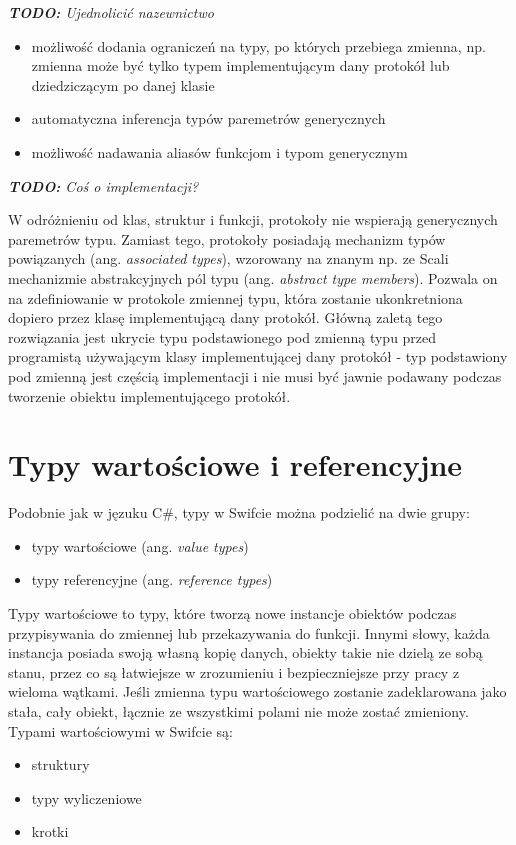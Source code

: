 \documentclass[mgr, shortabstract]{iithesis}
\newcommand{\todo}[1]{
  \textit{\textbf{TODO: }#1}
}
\newcommand{\ang}[1]{ang. \textit{#1}}
\begin{document}
\todo{Ujednolicić nazewnictwo}
\begin{itemize}
  \item możliwość dodania ograniczeń na typy, po których przebiega zmienna, np. zmienna może być tylko typem implementującym dany protokół lub dziedziczącym po danej klasie
  \item automatyczna inferencja typów paremetrów generycznych
  \item możliwość nadawania aliasów funkcjom i typom generycznym
\end{itemize}
\todo{Coś o implementacji?}

W odróżnieniu od klas, struktur i funkcji, protokoły nie wspierają generycznych paremetrów typu. Zamiast tego, protokoły posiadają mechanizm typów powiązanych (\ang{associated types}), wzorowany na znanym np. ze Scali mechanizmie abstrakcyjnych pól typu (\ang{abstract type members}). Pozwala on na zdefiniowanie w protokole zmiennej typu, która zostanie ukonkretniona dopiero przez klasę implementującą dany protokół. Główną zaletą tego rozwiązania jest ukrycie typu podstawionego pod zmienną typu przed programistą używającym klasy implementującej dany protokół - typ podstawiony pod zmienną jest częścią implementacji i nie musi być jawnie podawany podczas tworzenie obiektu implementującego protokół.

\section{Typy wartościowe i referencyjne}

Podobnie jak w jęzuku C\#, typy w Swifcie można podzielić na dwie grupy:

\begin{itemize}
    \item typy wartościowe (\ang{value types})
    \item typy referencyjne (\ang{reference types})
\end{itemize}

Typy wartościowe to typy, które tworzą nowe instancje obiektów podczas przypisywania do zmiennej lub przekazywania do funkcji. Innymi słowy, każda instancja posiada swoją własną kopię danych, obiekty takie nie dzielą ze sobą stanu, przez co są łatwiejsze w zrozumieniu i bezpieczniejsze przy pracy z wieloma wątkami. Jeśli zmienna typu wartościowego zostanie zadeklarowana jako stała, cały obiekt, łącznie ze wszystkimi polami nie może zostać zmieniony. Typami wartościowymi w Swifcie są:

\begin{itemize}
    \item struktury
    \item typy wyliczeniowe
    \item krotki
\end{itemize}
\end{document}
